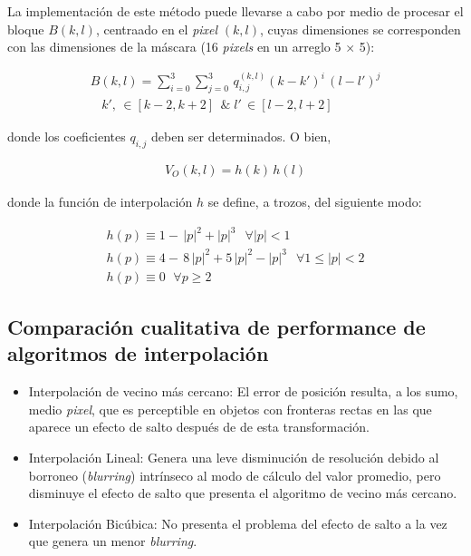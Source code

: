 %
La implementaci\'on de este m\'etodo puede llevarse a cabo por medio de
procesar el bloque $B(k, l)$, centraado en el \textit{pixel}
$(k, l)$, cuyas dimensiones se corresponden con las dimensiones de la m\'ascara
(16 \textit{pixels} en un arreglo 5 $\times$ 5):

\begin{eqnarray}
	B(k, l) = \sum _{i=0}^{3} \sum _{j=0}^{3} \,
q^{(k, l)}_{i, j} (k - k')^{i} \, (l - l')^{j} \\ \nonumber
\, \, \; \; k', \,  \in [k - 2, k + 2] \; \, \& \;
l' \,  \in [l - 2, l + 2]
\label{EqXXX}
\end{eqnarray}

donde los coeficientes $q_{i, j}$ deben ser determinados.
%
O bien,

\begin{eqnarray}
	V_{O}(k, l) = h(k) \, h(l)
\label{EqXXXI}
\end{eqnarray}


donde la funci\'on de interpolaci\'on $h$ se define, a trozos, del siguiente modo:

\begin{eqnarray}
	h(p) \equiv 1 - \, \lvert p \rvert^{2} + \lvert p \rvert^{3} \; \, \; \forall \lvert p \rvert < 1 \nonumber \\
	h(p) \equiv 4 - \, 8 \, \lvert p \rvert^{2} + 5 \, \lvert p \rvert^{2} - \lvert p \rvert^{3} \; \, \; \forall 1 \leq \lvert p \rvert < 2 \\
	h(p) \equiv 0 \, \; \, \forall p \geq 2 \nonumber
\label{EqXXXII}
\end{eqnarray}


\subsection{Comparaci\'on cualitativa de performance de algoritmos de  interpolaci\'on}

\begin{itemize}
 \item Interpolaci\'on de vecino m\'as cercano: El error de posici\'on resulta, a los sumo, medio \textit{pixel}, que es perceptible en objetos con
fronteras rectas en las que aparece un efecto de salto despu\'es de de esta transformaci\'on.
 \item Interpolaci\'on Lineal: Genera una leve disminuci\'on de resoluci\'on debido al borroneo (\textit{blurring}) intr\'inseco al modo de c\'alculo
 del valor promedio, pero disminuye el efecto de salto que presenta el algoritmo de vecino m\'as cercano.
 \item Interpolaci\'on Bic\'ubica: No presenta el problema del efecto de salto a la vez que genera un menor \textit{blurring}.
\end{itemize}


